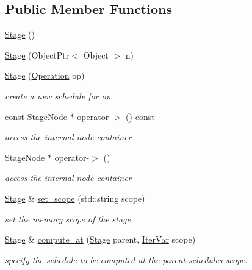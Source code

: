 \subsection*{Public Member Functions}
\begin{DoxyCompactItemize}
\item 
\hyperlink{classtvm_1_1te_1_1Stage_afec82602b9321c489b88632a005335f8}{Stage} ()
\item 
\hyperlink{classtvm_1_1te_1_1Stage_aa6ace38b6312e42aaf9389c8749ae0a4}{Stage} (Object\+Ptr$<$ Object $>$ n)
\item 
\hyperlink{classtvm_1_1te_1_1Stage_a1ecdc9a000be62c9cc26a96d4c33e36e}{Stage} (\hyperlink{classtvm_1_1te_1_1Operation}{Operation} op)
\begin{DoxyCompactList}\small\item\em create a new schedule for op. \end{DoxyCompactList}\item 
const \hyperlink{classtvm_1_1te_1_1StageNode}{Stage\+Node} $\ast$ \hyperlink{classtvm_1_1te_1_1Stage_adb81d41e9f0722f4b49cf1175814cc37}{operator-\/$>$} () const 
\begin{DoxyCompactList}\small\item\em access the internal node container \end{DoxyCompactList}\item 
\hyperlink{classtvm_1_1te_1_1StageNode}{Stage\+Node} $\ast$ \hyperlink{classtvm_1_1te_1_1Stage_a427ef4fef2edf15624be2c87bdad9505}{operator-\/$>$} ()
\begin{DoxyCompactList}\small\item\em access the internal node container \end{DoxyCompactList}\item 
\hyperlink{classtvm_1_1te_1_1Stage}{Stage} \& \hyperlink{classtvm_1_1te_1_1Stage_a0dc42f190125f0cf63e8d749ae66af7c}{set\+\_\+scope} (std\+::string scope)
\begin{DoxyCompactList}\small\item\em set the memory scope of the stage \end{DoxyCompactList}\item 
\hyperlink{classtvm_1_1te_1_1Stage}{Stage} \& \hyperlink{classtvm_1_1te_1_1Stage_a071545484de7a894c01ccf0e77183730}{compute\+\_\+at} (\hyperlink{classtvm_1_1te_1_1Stage}{Stage} parent, \hyperlink{classtvm_1_1tir_1_1IterVar}{Iter\+Var} scope)
\begin{DoxyCompactList}\small\item\em specify the schedule to be computed at the parent schedule\textquotesingle{}s scope. \end{DoxyCompactList}\item 

\end{DoxyCompactItemize}
